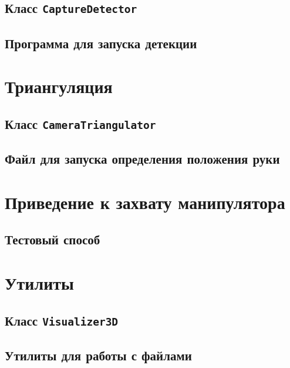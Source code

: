\documentclass[12pt, a4paper]{article}
\begin{document}
\subsection{Класс \texttt{CaptureDetector}}

\subsection{Программа для запуска детекции}


\section{Триангуляция}
\subsection{Класс \texttt{CameraTriangulator}}


\subsection{Файл для запуска определения положения руки}


\section{Приведение к захвату манипулятора}
\subsection{Тестовый способ}


\section{Утилиты}

\subsection{Класс \texttt{Visualizer3D}}


\subsection{Утилиты для работы с файлами}


\printbibliography
% 
% 
  
\end{document}
